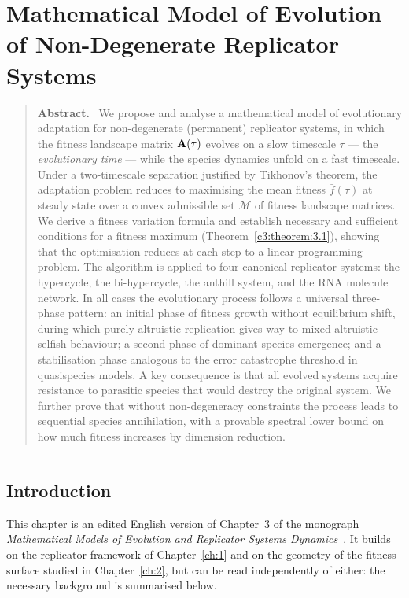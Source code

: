 \documentclass[12pt]{report}
\theoremstyle{definition}
\theoremstyle{remark}
\newenvironment{chapterabstract}
  {\begin{quotation}\small\noindent\textbf{Abstract.}\ }
  {\end{quotation}}
\begin{document}
\chapter{Mathematical Model of Evolution of Non-Degenerate Replicator Systems}
\label{ch:3}

\begin{chapterabstract}
We propose and analyse a mathematical model of evolutionary adaptation for
non-degenerate (permanent) replicator systems, in which the fitness landscape
matrix ${\bf A}(\tau)$ evolves on a slow timescale $\tau$ --- the
\textit{evolutionary time} --- while the species dynamics unfold on a fast
timescale. Under a two-timescale separation justified by Tikhonov's theorem,
the adaptation problem reduces to maximising the mean fitness $\bar{f}(\tau)$
at steady state over a convex admissible set $\mathcal{M}$ of fitness landscape
matrices. We derive a fitness variation formula and establish necessary and
sufficient conditions for a fitness maximum (Theorem~\ref{c3:theorem:3.1}), showing that the
optimisation reduces at each step to a linear programming problem. The algorithm
is applied to four canonical replicator systems: the hypercycle, the
bi-hypercycle, the anthill system, and the RNA molecule network. In all cases
the evolutionary process follows a universal three-phase pattern: an initial
phase of fitness growth without equilibrium shift, during which purely altruistic
replication gives way to mixed altruistic--selfish behaviour; a second phase of
dominant species emergence; and a stabilisation phase analogous to the error
catastrophe threshold in quasispecies models. A key consequence is that all
evolved systems acquire resistance to parasitic species that would destroy the
original system. We further prove that without non-degeneracy constraints the
process leads to sequential species annihilation, with a provable spectral lower
bound on how much fitness increases by dimension reduction.
\end{chapterabstract}

\bigskip\hrule\bigskip



\section*{Introduction}

This chapter is an edited English version of Chapter~3 of the monograph
\textit{Mathematical Models of Evolution and Replicator Systems
Dynamics}~\cite{c3:BratusBook2022}. It builds on the replicator framework of
Chapter~\ref{ch:1} and on the geometry of the fitness surface studied in
Chapter~\ref{ch:2}, but can be read independently of either: the necessary
background is summarised below.
\end{document}
